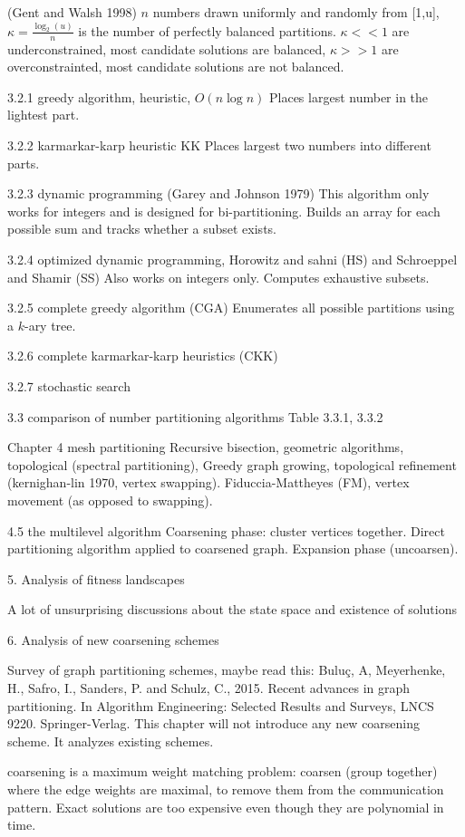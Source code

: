 \documentclass{article}
\begin{document}
(Gent and Walsh 1998) $n$ numbers drawn uniformly and randomly from [1,u],
$\kappa = \frac{\log_2(u)}{n}$ is the number of perfectly balanced partitions.
$\kappa << 1$ are underconstrained, most candidate solutions are balanced,
$\kappa >> 1$ are overconstrainted, most candidate solutions are not balanced.

3.2.1 greedy algorithm, heuristic, $O(n \log n)$
Places largest number in the lightest part.

3.2.2 karmarkar-karp heuristic KK
Places largest two numbers into different parts.

3.2.3 dynamic programming (Garey and Johnson 1979)
This algorithm only works for integers and is designed for bi-partitioning.
Builds an array for each possible sum and tracks whether a subset exists.

3.2.4 optimized dynamic programming, Horowitz and sahni (HS) and Schroeppel and Shamir (SS)
Also works on integers only.
Computes exhaustive subsets.

3.2.5 complete greedy algorithm (CGA)
Enumerates all possible partitions using a $k$-ary tree.

3.2.6 complete karmarkar-karp heuristics (CKK)

3.2.7 stochastic search

3.3 comparison of number partitioning algorithms
Table 3.3.1, 3.3.2

Chapter 4 mesh partitioning
Recursive bisection, geometric algorithms, topological (spectral partitioning), 
Greedy graph growing, topological refinement (kernighan-lin 1970, vertex swapping).
Fiduccia-Mattheyes (FM), vertex movement (as opposed to swapping).

4.5 the multilevel algorithm
Coarsening phase: cluster vertices together.
Direct partitioning algorithm applied to coarsened graph.
Expansion phase (uncoarsen).

5. Analysis of fitness landscapes

A lot of unsurprising discussions about the state space and existence of solutions

6. Analysis of new coarsening schemes

Survey of graph partitioning schemes, maybe read this:
Buluç, A, Meyerhenke, H., Safro, I., Sanders, P. and Schulz, C., 2015. Recent advances in graph partitioning. In Algorithm Engineering: Selected Results and Surveys, LNCS 9220. Springer-Verlag. 
This chapter will not introduce any new coarsening scheme.
It analyzes existing schemes.

coarsening is a maximum weight matching problem: coarsen (group together) where the edge weights are maximal, to remove them from the communication pattern.
Exact solutions are too expensive even though they are polynomial in time.
\end{document}
